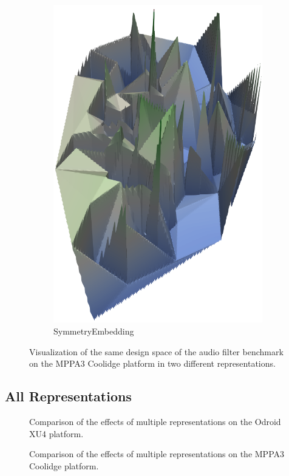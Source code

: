 \begin{figure}[t]
\begin{subfigure}[b]{0.43\textwidth}
    \includegraphics[width=\textwidth]{figures/coolidge-af-space-emb-sym.png}
		\caption{SymmetryEmbedding}
		\label{fig:lvars-bench-overhead}
	\end{subfigure}

	\caption{Visualization of the same design space of the audio filter benchmark on the MPPA3 Coolidge platform in two different representations.}%
	\label{fig:visualization_simpvec_symemb}
\end{figure}

\subsection{All Representations}
\begin{figure}[h]
	\centering
   \resizebox{0.95\textwidth}{!}{}
	\caption{Comparison of the effects of multiple representations on the Odroid XU4 platform.}
	\label{fig:multiple_representations_exynos}
\end{figure}

\begin{figure}[h]
	\centering
   \resizebox{0.95\textwidth}{!}{}
	\caption{Comparison of the effects of multiple representations on the MPPA3 Coolidge platform.}
	\label{fig:multiple_representations_exynos}
\end{figure}